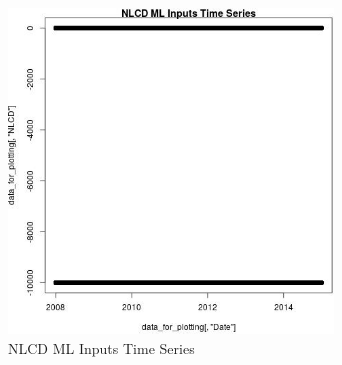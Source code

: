 \begin{figure} 
\centering  
\includegraphics[width=0.77\textwidth]{Code_Outputs/ML_input_report_ML_input_PM25_Step5_part_d_de_duplicated_aves_ML_input_NLCDvDate.jpg} 
\caption{\label{fig:ML_input_report_ML_input_PM25_Step5_part_d_de_duplicated_aves_ML_inputNLCDvDate}NLCD ML Inputs Time Series} 
\end{figure} 
 
